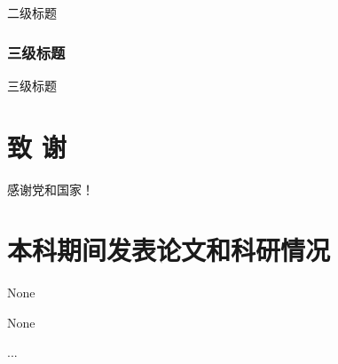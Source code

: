 \documentclass[openany,oneside]{book}
\begin{document}
二级标题

\subsection{三级标题}

三级标题


\clearpage
{}
{}

\chapter*{致 \qquad 谢}
\thispagestyle{empty}
感谢党和国家！
\chapter*{本科期间发表论文和科研情况}
None
None
\thispagestyle{empty}

...
\end{document}
